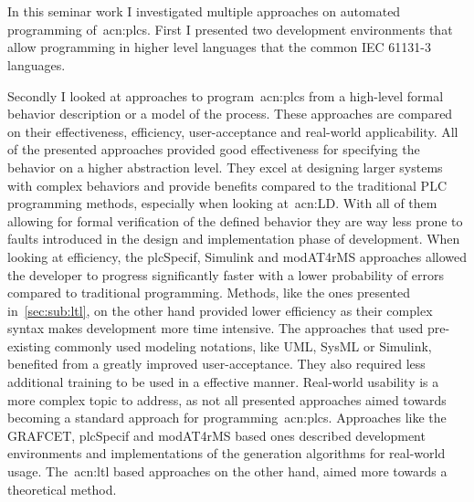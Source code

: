 \chapter{}
\label{sec:conclusion}

In this seminar work I investigated multiple approaches on automated programming of~\acrlong{acn:plc}s.
First I presented two development environments that allow programming in higher level languages that the common IEC 61131-3 languages.

Secondly I looked at approaches to program~\acrshort{acn:plc}s from a high-level formal behavior description or a model of the process.
These approaches are compared on their effectiveness, efficiency, user-acceptance and real-world applicability.
All of the presented approaches provided good effectiveness for specifying the behavior on a higher abstraction level.
They excel at designing larger systems with complex behaviors and provide benefits compared to the traditional PLC programming methods, especially when looking at~\acrshort{acn:LD}.
With all of them allowing for formal verification of the defined behavior they are way less prone to faults introduced in the design and implementation phase of development.
When looking at efficiency, the plcSpecif, Simulink and modAT4rMS approaches allowed the developer to progress significantly faster with a lower probability of errors compared to traditional programming.
Methods, like the ones presented in~\ref{sec:sub:ltl}, on the other hand provided lower efficiency as their complex syntax makes development more time intensive.
The approaches that used pre-existing commonly used modeling notations, like UML, SysML or Simulink, benefited from a greatly improved user-acceptance.
They also required less additional training to be used in a effective manner.
Real-world usability is a more complex topic to address, as not all presented approaches aimed towards becoming a standard approach for programming~\acrshort{acn:plc}s.
Approaches like the GRAFCET,  plcSpecif and modAT4rMS based ones described development environments and implementations of the generation algorithms for real-world usage.
The~\acrshort{acn:ltl} based approaches on the other hand, aimed more towards a theoretical method.

